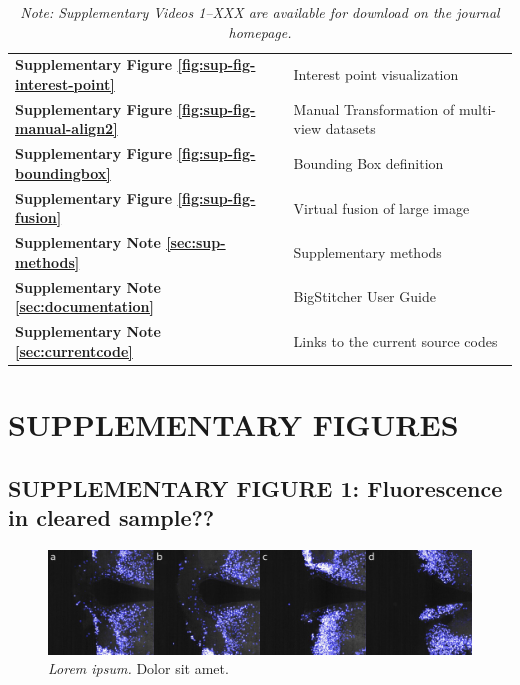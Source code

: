 \documentclass[]{spie}  %
\newcommand\tablespace{\vspace{2.5mm}}
\begin{document}
\begin{table}[h!]
{\begin{tabular}{lp{11cm}}
\textbf{Supplementary Figure \ref{fig:sup-fig-interest-point}} & Interest point visualization \tablespace \\
\textbf{Supplementary Figure \ref{fig:sup-fig-manual-align2}} & Manual Transformation of multi-view datasets \tablespace \\
\textbf{Supplementary Figure \ref{fig:sup-fig-boundingbox}} & Bounding Box definition \tablespace \\
\textbf{Supplementary Figure \ref{fig:sup-fig-fusion}} & Virtual fusion of large image \tablespace \\
\textbf{Supplementary Note \ref{sec:sup-methods}} & Supplementary methods \tablespace \\
\textbf{Supplementary Note \ref{sec:documentation}} & BigStitcher User Guide \tablespace \\
\textbf{Supplementary Note \ref{sec:currentcode}} & Links to the current source codes \tablespace \\

\end{tabular}}
\caption{\emph{Note: Supplementary Videos 1--XXX are available for download on the journal homepage.}}
\end{table}

\pagebreak

\section*{SUPPLEMENTARY FIGURES}


\subsection*{SUPPLEMENTARY FIGURE 1: Fluorescence in cleared sample??}
\vspace{1mm}
\begin{figure}[h!]
\includegraphics[width=\textwidth]{fig-rf.png}
\vspace{-2.0mm}
\caption{\hspace{-0.5mm} \emph{Lorem ipsum.} Dolor sit amet.
}
\label{fig:sup-fig-rf}
\end{figure}
\end{document}
